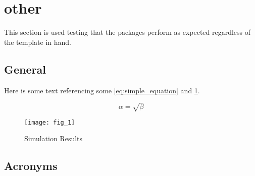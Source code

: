 \graphicspath{ {./content/other/figures/} }

\section{other}
\label{sec:other}  %

This section is used testing that the packages perform as expected regardless of the template in hand.

\subsection{General}
\label{sec:other:general}
Here is some text referencing some \cref{eq:simple_equation} and \cref{fig:simulationfigure}.

\begin{equation}
    \label{eq:simple_equation}
    \alpha = \sqrt{ \beta }
\end{equation}

\begin{figure}
    \centering
    \texttt{[image: fig\_1]}
    \caption{Simulation Results}
    \label{fig:simulationfigure}
\end{figure}

% 

\subsection{Acronyms}
\label{sec:other:acro}




